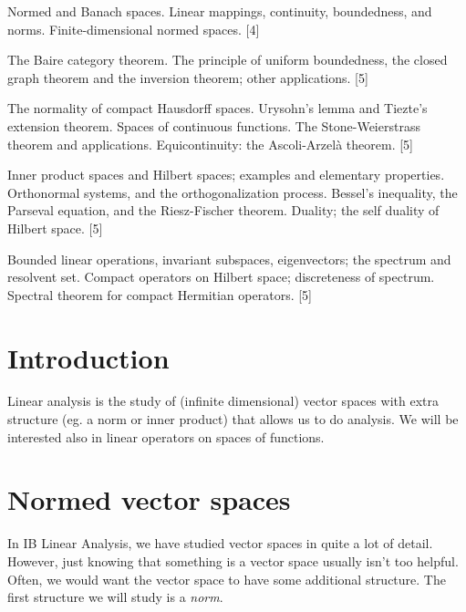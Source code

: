 \documentclass[a4paper]{article}
\begin{document}
\maketitle
{\small
\noindent Normed and Banach spaces. Linear mappings, continuity, boundedness, and norms. Finite-dimensional normed spaces.\hspace*{\fill} [4]

\vspace{5pt}
\noindent The Baire category theorem. The principle of uniform boundedness, the closed graph theorem and the inversion theorem; other applications.\hspace*{\fill} [5]

\vspace{5pt}
\noindent The normality of compact Hausdorff spaces. Urysohn's lemma and Tiezte's extension theorem. Spaces of continuous functions. The Stone-Weierstrass theorem and applications. Equicontinuity: the Ascoli-Arzel\`a theorem.\hspace*{\fill} [5]

\vspace{5pt}
\noindent Inner product spaces and Hilbert spaces; examples and elementary properties. Orthonormal systems, and the orthogonalization process. Bessel's inequality, the Parseval equation, and the Riesz-Fischer theorem. Duality; the self duality of Hilbert space.\hspace*{\fill} [5]

\vspace{5pt}
\noindent Bounded linear operations, invariant subspaces, eigenvectors; the spectrum and resolvent set. Compact operators on Hilbert space; discreteness of spectrum. Spectral theorem for compact Hermitian operators.\hspace*{\fill} [5]}

\tableofcontents

\setcounter{section}{-1}
\section{Introduction}
Linear analysis is the study of (infinite dimensional) vector spaces with extra structure (eg. a norm or inner product) that allows us to do analysis. We will be interested also in linear operators on spaces of functions.

\section{Normed vector spaces}
In IB Linear Analysis, we have studied vector spaces in quite a lot of detail. However, just knowing that something is a vector space usually isn't too helpful. Often, we would want the vector space to have some additional structure. The first structure we will study is a \emph{norm}.
\end{document}
